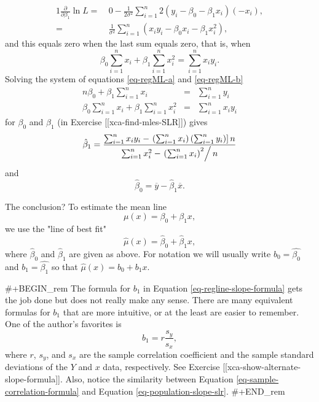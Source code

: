 \begin{alignat}{1}
\frac{\partial}{\partial \beta_{1}} \ln L = \ & 0 - \frac{1}{2\sigma^{2}} \sum_{i=1}^{n} 2 (y_{i} - \beta_{0} - \beta_{1} x_{i})(-x_{i}),\\ = & \frac{1}{\sigma^{2}}\sum_{i = 1}^{n}\left(x_{i} y_{i} - \beta_{0}x_{i} - \beta_{1}x_{i}^{2}\right),
\end{alignat}
and this equals zero when the last sum equals zero, that is, when
\begin{equation}
\label{eq-regML-b}
\beta_{0} \sum_{i = 1}^{n}x_{i} + \beta_{1} \sum_{i = 1}^{n}x_{i}^{2} = \sum_{i = 1}^{n}x_{i}y_{i}.
\end{equation}
Solving the system of equations \eqref{eq-regML-a} and \eqref{eq-regML-b}
\begin{eqnarray}
n\beta_{0} + \beta_{1}\sum_{i = 1}^{n}x_{i} & = & \sum_{i = 1}^{n}y_{i}\\
\beta_{0}\sum_{i = 1}^{n}x_{i}+\beta_{1}\sum_{i = 1}^{n}x_{i}^{2} & = & \sum_{i = 1}^{n}x_{i}y_{i}
\end{eqnarray}
for \( \beta_{0} \) and \( \beta_{1} \) (in Exercise [[xca-find-mles-SLR]]) gives
\begin{equation}
\label{eq-regline-slope-formula}
\hat{\beta}_{1} = \frac{\sum_{i = 1}^{n}x_{i}y_{i} - \left.\left(\sum_{i = 1}^{n}x_{i}\right)\left(\sum_{i = 1}^{n}y_{i}\right)\right] n}{\sum_{i = 1}^{n}x_{i}^{2} - \left.\left(\sum_{i = 1}^{n}x_{i}\right)^{2}\right/ n}
\end{equation}
and
\begin{equation}
\hat{\beta}_{0} = \overline{y} - \hat{\beta}_{1}\overline{x}.
\end{equation}

The conclusion? To estimate the mean line 
\begin{equation}
\mu(x) = \beta_{0} + \beta_{1}x,
\end{equation}
we use the "line of best fit"
\begin{equation}
\hat{\mu}(x) = \hat{\beta}_{0} + \hat{\beta}_{1}x,
\end{equation}
where \(\hat{\beta}_{0}\) and \(\hat{\beta}_{1}\) are given as
above. For notation we will usually write \( b_{0} = \hat{\beta_{0}}
\) and \( b_{1}=\hat{\beta_{1}} \) so that \( \hat{\mu}(x) = b_{0} +
b_{1}x \).

#+BEGIN_rem
The formula for \( b_{1} \) in Equation \eqref{eq-regline-slope-formula} gets
the job done but does not really make any sense. There are many
equivalent formulas for \( b_{1} \) that are more intuitive, or at the
least are easier to remember. One of the author's favorites is
\begin{equation}
\label{eq-sample-correlation-formula}
b_{1} = r\frac{s_{y}}{s_{x}},
\end{equation}
where \(r\), \( s_{y} \), and \( s_{x} \) are the sample correlation
coefficient and the sample standard deviations of the \(Y\) and \(x\)
data, respectively. See Exercise
[[xca-show-alternate-slope-formula]]. Also, notice the similarity between
Equation \eqref{eq-sample-correlation-formula} and Equation
\eqref{eq-population-slope-slr}.
#+END_rem

